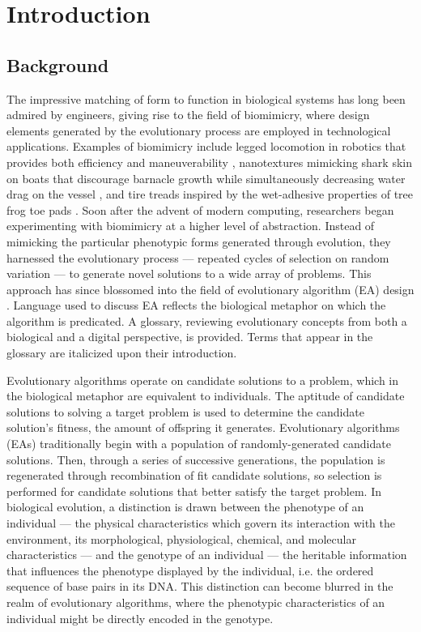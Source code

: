 \chapter{Introduction}

\section{Background} \label{sec:background}
The impressive matching of form to function in biological systems has long been admired by engineers, giving rise to the field of biomimicry, where design elements generated by the evolutionary process are employed in technological applications. Examples of biomimicry include legged locomotion in robotics that provides both efficiency and maneuverability \cite{Grimes2012THE}, nanotextures mimicking shark skin on boats that discourage barnacle growth while simultaneously decreasing water drag on the vessel \cite{Stenzel2011Drag-reducingShipping}, and tire treads inspired by the wet-adhesive properties of tree frog toe pads \cite{Persson2007WetTires}.
Soon after the advent of modern computing, researchers began experimenting with biomimicry at a higher level of abstraction. Instead of mimicking the particular phenotypic forms generated through evolution, they harnessed the evolutionary process --- repeated cycles of selection on random variation --- to generate novel solutions to a wide array of problems.
This approach has since blossomed into the field of evolutionary algorithm (EA) design \cite{Mitchell1996AnAlgorithms}.
Language used to discuss EA reflects the biological metaphor on which the algorithm is predicated.
A glossary, reviewing evolutionary concepts from both a biological and a digital perspective, is provided.
Terms that appear in the glossary are italicized upon their introduction.


Evolutionary algorithms operate on candidate solutions to a problem, which in the biological metaphor are equivalent to \glspl{individual}.
The aptitude of candidate solutions to solving a target problem is used to determine the candidate solution's \gls{fitness}, the amount of offspring it generates.
Evolutionary algorithms (EAs) traditionally begin with a \gls{population} of randomly-generated candidate solutions.
Then, through a series of successive generations, the population is regenerated through \gls{recombination} of fit candidate solutions, so \gls{selection} is performed for candidate solutions that better satisfy the target problem.
In biological evolution, a distinction is drawn between the \gls{phenotype} of an individual --- the physical characteristics which govern its interaction with the environment, its morphological, physiological, chemical, and molecular characteristics --- and the \gls{genotype} of an individual --- the heritable information that influences the phenotype displayed by the individual, i.e. the ordered sequence of base pairs in its DNA.
This distinction can become blurred in the realm of evolutionary algorithms, where the phenotypic characteristics of an individual might be directly encoded in the genotype.

